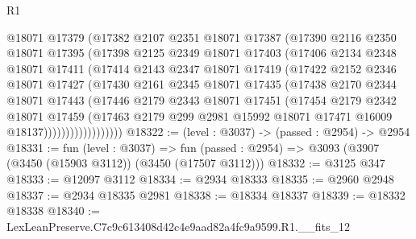 \begin{lexlean}{R1}
\begin{coremodule}
                  @18071
                  @17379
                  (@17382
                    @2107
                    @2351
                    @18071
                    @17387
                    (@17390
                      @2116
                      @2350
                      @18071
                      @17395
                      (@17398
                        @2125
                        @2349
                        @18071
                        @17403
                        (@17406
                          @2134
                          @2348
                          @18071
                          @17411
                          (@17414
                            @2143
                            @2347
                            @18071
                            @17419
                            (@17422
                              @2152
                              @2346
                              @18071
                              @17427
                              (@17430
                                @2161
                                @2345
                                @18071
                                @17435
                                (@17438
                                  @2170
                                  @2344
                                  @18071
                                  @17443
                                  (@17446
                                    @2179
                                    @2343
                                    @18071
                                    @17451
                                    (@17454
                                      @2179
                                      @2342
                                      @18071
                                      @17459
                                      (@17463
                                        @2179
                                        @299
                                        @2981
                                        @15992
                                        @18071
                                        @17471
                                        @16009
                                        @18137))))))))))))))))))
@18322 := (level : @3037) -> (passed : @2954) -> @2954
@18331 := fun (level : @3037) =>
  fun (passed : @2954) => @3093 (@3907 (@3450 (@15903 @3112)) (@3450 (@17507 @3112)))
@18332 := @3125 @347
@18333 := @12097 @3112
@18334 := @2934 @18333
@18335 := @2960 @2948
@18337 := @2934 @18335 @2981
@18338 := @18334 @18337
@18339 := @18332 @18338
@18340 := LexLeanPreserve.C7c9c613408d42c4e9aad82a4fc9a9599.R1.__fits_12

\end{coremodule}
\end{lexlean}

